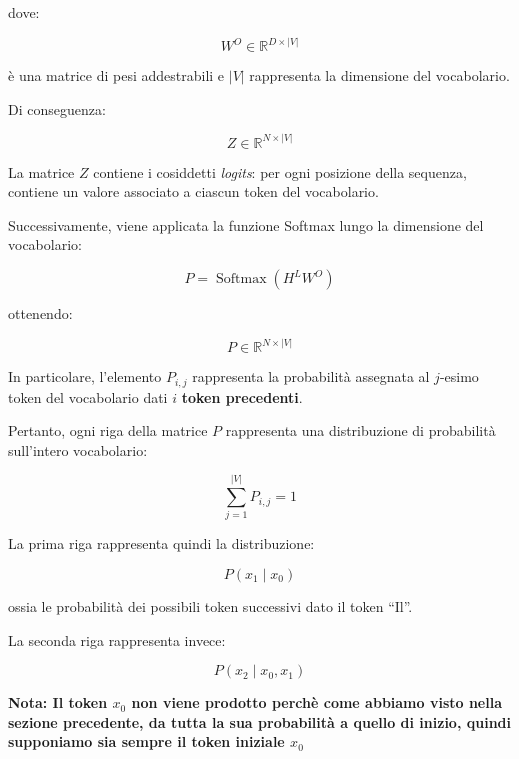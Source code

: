 dove:

\begin{equation}
W^O \in \mathbb{R}^{D\times |V|}
\end{equation}

è una matrice di pesi addestrabili e $|V|$ rappresenta la dimensione del vocabolario.

Di conseguenza:

\begin{equation}
Z\in\mathbb{R}^{N\times |V|}
\end{equation}

La matrice $Z$ contiene i cosiddetti \textit{logits}: per ogni posizione della sequenza, contiene un valore associato a ciascun token del vocabolario.

Successivamente, viene applicata la funzione Softmax lungo la dimensione del vocabolario:

\begin{equation}
P
=
\operatorname{Softmax}(H^L W^O)
\end{equation}

ottenendo:

\begin{equation}
P\in\mathbb{R}^{N\times |V|}
\end{equation}

In particolare, l'elemento $P_{i,j}$ rappresenta la probabilità assegnata al $j$-esimo token del vocabolario dati $i$ \textbf{token precedenti}.

Pertanto, ogni riga della matrice $P$ rappresenta una distribuzione di probabilità sull'intero vocabolario:

\begin{equation}
\sum_{j=1}^{|V|}P_{i,j}=1
\end{equation}


La prima riga rappresenta quindi la distribuzione:

\begin{equation}
P(x_1\mid x_0)
\end{equation}

ossia le probabilità dei possibili token successivi dato il token ``Il''.

La seconda riga rappresenta invece:

\begin{equation}
P(x_2\mid x_0,x_1)
\end{equation}


\textbf{Nota: Il token $x_0$ non viene prodotto perchè come abbiamo visto nella sezione precedente, da tutta la sua probabilità a quello di inizio, quindi supponiamo sia sempre il token iniziale $x_0$}


